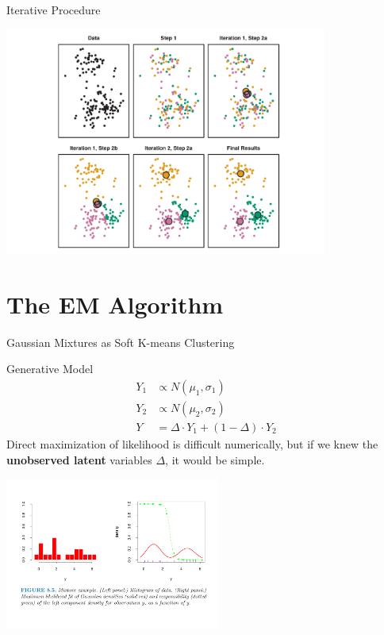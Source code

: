 \documentclass[
  ignorenonframetext,
]{beamer}
\begin{document}
\begin{frame}{Iterative Procedure}
\protect\hypertarget{iterative-procedure}{}

\begin{center}\includegraphics[height=7.5cm]{figures/ISLR_fig10-6_KMeans} \end{center}

\end{frame}

\hypertarget{the-em-algorithm}{%
\section{The EM Algorithm}\label{the-em-algorithm}}

\begin{frame}{Gaussian Mixtures as Soft K-means Clustering}
\protect\hypertarget{gaussian-mixtures-as-soft-k-means-clustering}{}

\footnotesize

Generative Model \begin{equation}
\begin{aligned}
Y_1 &\propto N(\mu_1,\sigma_1)\\
Y_2 &\propto N(\mu_2,\sigma_2)\\
Y &= \Delta \cdot Y_1 + (1- \Delta) \cdot Y_2 
\end{aligned}
\end{equation} Direct maximization of likelihood is difficult
numerically, but if we knew the \textbf{unobserved latent} variables
\(\Delta\), it would be simple.

\begin{center}\includegraphics[height=5cm]{figures/ESL-Fig8-5} \end{center}

\end{frame}
\end{document}
